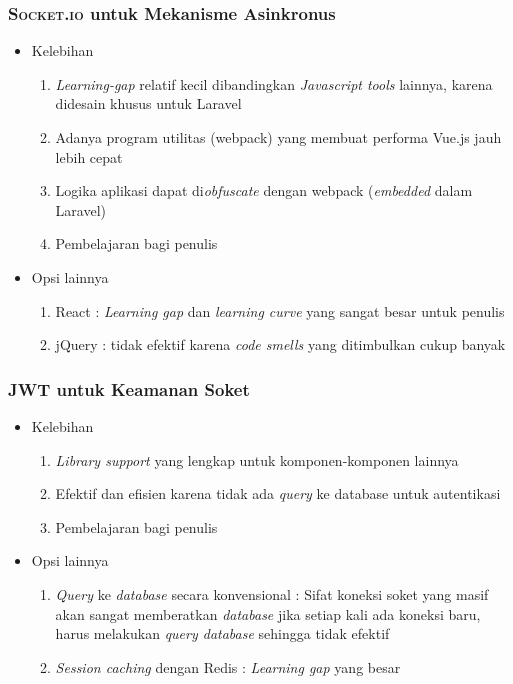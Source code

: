 	\subsubsection{\textsc{Socket.io} untuk Mekanisme Asinkronus}
		\begin{itemize}
			\item Kelebihan
			\begin{enumerate}
				\item \textit{Learning-gap} relatif kecil dibandingkan \textit{Javascript tools} lainnya, karena didesain khusus untuk Laravel
				\item Adanya program utilitas (webpack) yang membuat performa Vue.js jauh lebih cepat
				\item Logika aplikasi dapat di\textit{obfuscate} dengan webpack (\textit{embedded} dalam Laravel)
				\item Pembelajaran bagi penulis
			\end{enumerate}
			\item Opsi lainnya
			\begin{enumerate}
				\item React : \textit{Learning gap} dan \textit{learning curve} yang sangat besar untuk penulis
				\item jQuery : tidak efektif karena \textit{code smells} yang ditimbulkan cukup banyak
			\end{enumerate}
		\end{itemize}		
		
	\subsubsection{\textsc{JWT} untuk Keamanan Soket}
		\begin{itemize}
			\item Kelebihan
			\begin{enumerate}
				\item \textit{Library support} yang lengkap untuk komponen-komponen lainnya
				\item Efektif dan efisien karena tidak ada \textit{query} ke database untuk autentikasi
				\item Pembelajaran bagi penulis
			\end{enumerate}
			\item Opsi lainnya
			\begin{enumerate}
				\item \textit{Query} ke \textit{database} secara konvensional : Sifat koneksi soket yang masif akan sangat memberatkan \textit{database} jika setiap kali ada koneksi baru, harus melakukan \textit{query database} sehingga tidak efektif
				\item \textit{Session caching} dengan Redis : \textit{Learning gap} yang besar
			\end{enumerate}
		\end{itemize}
		
